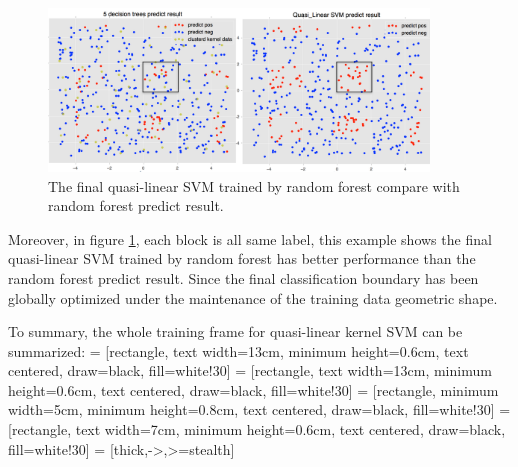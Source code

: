 \documentclass[master]{IPSstyle}
\begin{document}
{\begin{figure}[H]
    \centering
    \includegraphics[width=0.9\textwidth]{figures/ch3_RF_QLSVM_compare.png}
    \caption{The final quasi-linear SVM trained by random forest compare with random forest predict result.}
    \label{fg:QLSVM_RF_compare}
\end{figure}
Moreover, in figure \ref{fg:QLSVM_RF_compare}, each block is all same label, this example shows the final quasi-linear SVM trained by random forest has better performance than the random forest predict result. Since the final classification boundary has been globally optimized under the maintenance of the training data geometric shape.

To summary, the whole training frame for quasi-linear kernel SVM can be summarized:
 = [rectangle, text width=13cm, minimum height=0.6cm, text centered, draw=black, fill=white!30]
 = [rectangle, text width=13cm, minimum height=0.6cm, text centered, draw=black, fill=white!30]
 = [rectangle, minimum width=5cm, minimum height=0.8cm, text centered, draw=black, fill=white!30]
 = [rectangle, text width=7cm, minimum height=0.6cm, text centered, draw=black, fill=white!30]
 = [thick,->,>=stealth]
\begin{figure}[H]
\centering
{}
\end{figure}}
\end{document}
